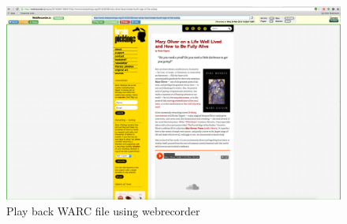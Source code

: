 \begin{itemize}
		  \begin{figure}[ht]
		  	 \begin{center}
		  	 		\includegraphics[scale=0.40]{webrecorderplayback2.png}
		  	 		\caption{Play back WARC file using webrecorder}
			  \end{center}
		  \end{figure}
\end{itemize}
\newpage